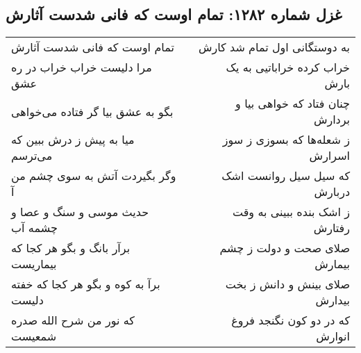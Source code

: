 \begin{center}
\section*{غزل شماره ۱۲۸۲: تمام اوست که فانی شدست آثارش}
\label{sec:1282}
\begin{longtable}{l p{0.5cm} r}
تمام اوست که فانی شدست آثارش
&&
به دوستگانی اول تمام شد کارش
\\
مرا دلیست خراب خراب در ره عشق
&&
خراب کرده خراباتیی به یک بارش
\\
بگو به عشق بیا گر فتاده می‌خواهی
&&
چنان فتاد که خواهی بیا و بردارش
\\
میا به پیش ز درش ببین که می‌ترسم
&&
ز شعله‌ها که بسوزی ز سوز اسرارش
\\
وگر بگیردت آتش به سوی چشم من آ
&&
که سیل سیل روانست اشک دربارش
\\
حدیث موسی و سنگ و عصا و چشمه آب
&&
ز اشک بنده ببینی به وقت رفتارش
\\
برآر بانگ و بگو هر کجا که بیماریست
&&
صلای صحت و دولت ز چشم بیمارش
\\
برآ به کوه و بگو هر کجا که خفته دلیست
&&
صلای بینش و دانش ز بخت بیدارش
\\
که نور من شرح الله صدره شمعیست
&&
که در دو کون نگنجد فروغ انوارش
\\
\end{longtable}
\end{center}
